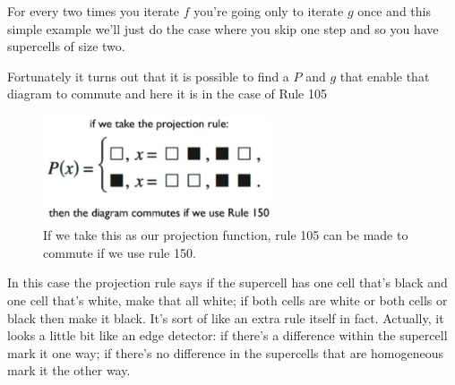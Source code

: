 \documentclass[]{article}
\begin{document}
For every two times you iterate $f$ you're going only to iterate $g$ once and this simple example we'll just do the case where you skip one step and so you have supercells of size two.

Fortunately it turns out that it is possible to find a $P$ and $g$ that enable that diagram to commute and here it is in the case of Rule 105

\begin{figure}[H]
	\begin{center}
		\caption[Rule 105 can be made to commute]{If we take this as our projection function, rule 105 can be made to commute if we use rule 150.}\label{fig:rule105-P}
		\includegraphics[width=0.6\textwidth]{rule105-P}
	\end{center}
\end{figure}
In this case the projection rule says if the supercell has one cell that's black and one cell that's white, make that all white; if both cells are white or both cells or black then make it black.
It's sort of like an extra rule itself in fact.
Actually, it looks a little bit like an edge detector: if there's a difference within the supercell mark it one way; if there's no difference in the supercells that are homogeneous mark it the other way.
\end{document}

